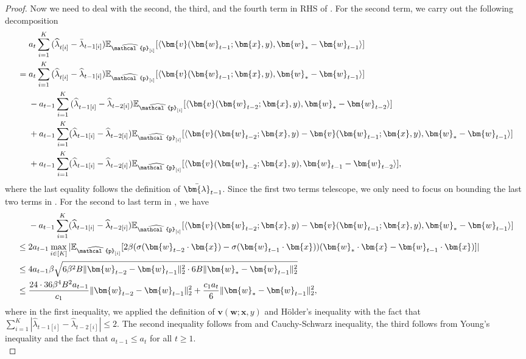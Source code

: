 \documentclass[11pt]{article}
\numberwithin{thm}{section}
\theoremstyle{plain}
\theoremstyle{definition}
\theoremstyle{remark} \newtheorem{remark}[thm]{Remark}
\def\vlambda{{\bm{\lambda}}}
\def\vv{{\bm{v}}}
\def\vw{{\bm{w}}}
\def\vx{{\bm{x}}}
\def\ep{\widehat{\mathcal{p}}}
\newcommand{\E}{\mathbb{E}}
\newcommand{\innp}[1]{\langle #1 \rangle}
\newcommand{\epi}{\ep_{[i]}}
\newcommand{\elambda}{\widehat{\lambda}}
\begin{document}
\begin{proof}
 Now we need to deal with the second, the third, and the fourth term in RHS of . For the second term, we carry out the following decomposition 
	\begin{align}\label{eq:St-term2}
		&a_t \sum_{i=1}^K{(\elambda}_{t[i]} -\bar\lambda_{t-1[i]})\E_{\epi}[\innp{\vv(\vw_{t-1};\vx,y), \vw_*-\vw_{t-1}}]   \notag \\ 
        =\;& a_t \sum_{i=1}^K{(\elambda}_{t[i]} -\elambda_{t-1[i]})\E_{\epi}[\innp{\vv(\vw_{t-1};\vx,y), \vw_*-\vw_{t-1}}]  \notag \\
         &-a_{t-1} \sum_{i=1}^K{(\elambda}_{t-1[i]} -\elambda_{t-2[i]})\E_{\epi}[\innp{\vv(\vw_{t-2};\vx,y), \vw_*-\vw_{t-2}}] \notag \\
        &+a_{t-1}\sum_{i=1}^K(\elambda_{t-1[i]}-{\elambda}_{t-2[i]})\E_{\epi}[\innp{\vv(\vw_{t-2};\vx,y)-\vv(\vw_{t-1};\vx,y), \vw_*-\vw_{t-1}}] \notag \\
	       &+a_{t-1}\sum_{i=1}^K(\elambda_{t-1[i]}-{\elambda}_{t-2[i]})\E_{\epi}[\innp{\vv(\vw_{t-2};\vx,y), \vw_{t-1}-\vw_{t-2}}], 
	\end{align}
	where the last equality follows the definition of \(\Bar{\vlambda}_{t-1}\). Since the first two terms telescope, we only need to focus on bounding the last two terms in .  
For the second to last term in , we have 
    \begin{align}\label{eq:St-term2-bound1}
		&-a_{t-1}\sum_{i=1}^K(\elambda_{t-1[i]}-{\elambda}_{t-2[i]})\E_{\epi}[\innp{\vv(\vw_{t-2};\vx,y)-\vv(\vw_{t-1};\vx,y), \vw_*-\vw_{t-1}}]\notag \\
        \leq\;& 2a_{t-1}\max_{i\in[K]}|\E_{\epi}[2\beta(\sigma(\vw_{t-2}\cdot \vx)-\sigma(\vw_{t-1}\cdot \vx))(\vw_*\cdot \vx-\vw_{t-1}\cdot \vx)]| \notag \\
		\leq\;& 4a_{t-1}\beta \sqrt{6\beta^2B\|\vw_{t-2}-\vw_{t-1}\|_2^2 \cdot 6B\|\vw_*-\vw_{t-1}\|_2^2} \notag \\
        \leq\;& \frac{24\cdot 36\beta^4 B^2a_{t-1}}{c_1}\|\vw_{t-2}-\vw_{t-1}\|_2^2+\frac{c_1a_t}{6}\|\vw_*-\vw_{t-1}\|_2^2,
	\end{align}
    where in the first inequality, we applied the definition of \(\vv(\vw;\vx,y)\) and H\"older's inequality with the fact that \(\sum_{i=1}^K|\elambda_{t-1[i]}-{\elambda}_{t-2[i]}|\le 2\). The second inequality follows from  and Cauchy-Schwarz inequality, the third follows from Young's inequality and the fact that \(a_{t-1}\le a_t\) for all \(t\ge 1\).\\

\end{proof}
\end{document}

